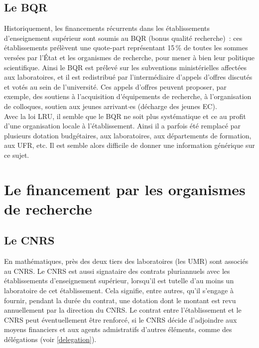 \subsection{Le BQR}

Historiquement, les financements r\'ecurrents dans les \'etablissements d'enseignement
sup\'erieur sont soumis au BQR (bonus qualit\'e recherche)~: ces
\'etablissements pr\'el\`event une quote-part repr\'esentant 15\,\% de
toutes les sommes vers\'ees par l'\'Etat et les organismes de
recherche, pour mener \`a bien leur politique scientifique.
Ainsi le BQR est pr\'elev\'e sur les subventions
minist\'erielles affect\'ees aux laboratoires, et il est redistribu\'e par
l'interm\'ediaire d'appels d'offres discut\'es et vot\'es au sein de l'universit\'e. 
Ces appels d'offres peuvent
proposer, par exemple, des soutiens \`a l'acquisition d'\'equipements de recherche,
\`a l'organisation de colloques, soutien aux jeunes arrivant$\cdot$es (d\'echarge des jeunes EC).\\

Avec la loi LRU, il semble que le BQR ne soit plus systématique et ce au profit d'une organisation locale à l'établissement.
Ainsi il a parfois été remplacé par plusieurs dotation budgétaires, aux laboratoires, aux départements de formation, aux UFR, etc.
Il est semble alors difficile de donner une information générique sur ce sujet.

\section{Le financement par les organismes de recherche}

\subsection{Le CNRS}


En math\'ematiques, pr\`es des deux tiers des laboratoires (les UMR)
sont associ\'es au CNRS. Le CNRS est aussi signataire des contrats pluriannuels avec les
\'etablissements d'enseignement su\-p\'e\-rieur, lorsqu'il est
tutelle d'au moins un laboratoire de cet \'etablissement. Cela
signifie, entre autres, qu'il s'engage \`a fournir, pendant la
dur\'ee du contrat, une dotation dont le montant est revu
annuellement par la direction du CNRS. Le contrat entre l'\'etablissement et le CNRS peut \'eventuellement
\^etre renforc\'e, si le CNRS d\'ecide d'adjoindre aux moyens
financiers et aux agents admistratifs d'autres \'el\'ements, comme des
d\'el\'egations (voir \ref{delegation}).

